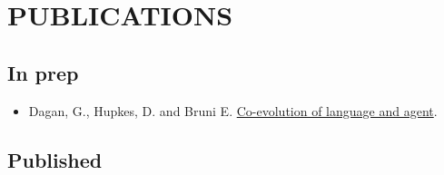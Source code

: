 \section{PUBLICATIONS}

\subsection{In prep}

\begin{itemize}
\setlength\itemsep{5pt}
    \item Dagan, G., Hupkes, D. and Bruni E. \href{https://arxiv.org/pdf/2001.03361.pdf}{Co-evolution of language and agent}.

\end{itemize}

\subsection{Published}

